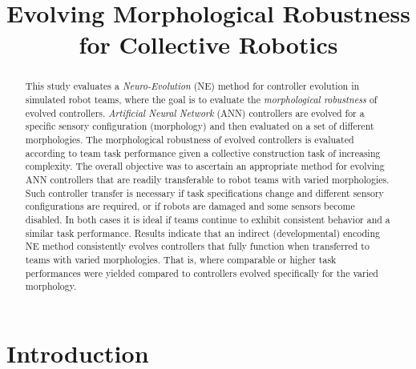 \documentclass[conference]{IEEEtran}
\begin{document}
\title{Evolving Morphological Robustness for Collective Robotics}

\author{
\and
{}
}

\maketitle

\begin{abstract}
This study evaluates a \textit{Neuro-Evolution} (NE) method for
controller evolution in simulated robot teams, where the goal is to
evaluate the \textit{morphological robustness} of evolved controllers.
\textit{Artificial Neural Network} (ANN) controllers are evolved
for a specific sensory configuration (morphology) and then evaluated on
a set of different morphologies.
The morphological robustness of evolved controllers is evaluated
according to team task performance given a collective construction task
of increasing complexity.
The overall objective was to ascertain an appropriate method for evolving
ANN controllers that are readily transferable to robot teams with varied morphologies.
Such controller transfer is
necessary if task specifications change and different sensory configurations
are required, or if robots are damaged and some sensors become disabled.
In both cases it is ideal if teams continue to exhibit consistent behavior
and a similar task performance.
Results indicate that an indirect (developmental) encoding NE method
consistently evolves controllers that fully function when transferred
to teams with varied morphologies.
That is, where comparable or higher task performances were yielded compared to
controllers evolved specifically for the varied morphology.
\end{abstract}

\IEEEpeerreviewmaketitle

\section{Introduction}
\end{document}
